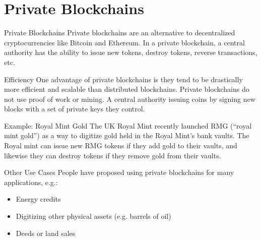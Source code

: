 \documentclass[14pt]{beamer}
\begin{document}

\section{Private Blockchains}

\begin{frame}{Private Blockchains}
  Private blockchains are an alternative to decentralized cryptocurrencies like
  Bitcoin and Ethereum.
  \newline
  \newline
  In a private blockchain, a central authority has the ability to issue new
  tokens, destroy tokens, reverse transactions, etc.
\end{frame}

\begin{frame}{Efficiency}
  One advantage of private blockchains is they tend to be drastically more
  efficient and scalable than distributed blockchains.
  \newline
  \newline
  Private blockchains do not use proof of work or mining. A central authority
  issuing coins by signing new blocks with a set of private keys they control.
\end{frame}

\begin{frame}{Example: Royal Mint Gold}
  The UK Royal Mint recently launched RMG (``royal mint gold'') as a way to
  digitize gold held in the Royal Mint's bank vaults.
  \newline
  \newline
  The Royal mint can issue new RMG tokens if they add gold to their vaults, and
  likewise they can destroy tokens if they remove gold from their vaults.
\end{frame}

\begin{frame}{Other Use Cases}
  People have proposed using private blockchains for many applications, e.g.:
  \newline
  \begin{itemize}
  \item Energy credits
  \item Digitizing other physical assets (e.g. barrels of oil)
  \item Deeds or land sales
  \end{itemize}
  \end{frame}
\end{document}
